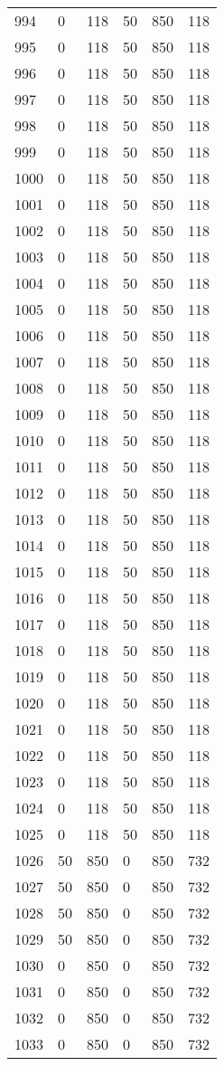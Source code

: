 \documentclass[a4paper]{ctexart}
\begin{document}
\begin{longtable}{p{1cm}|p{2cm}|p{2cm}|p{2cm}|P{2cm}|p{2cm}}
		994&0&118&50&850&118\\
		995&0&118&50&850&118\\
		996&0&118&50&850&118\\
		997&0&118&50&850&118\\
		998&0&118&50&850&118\\
		999&0&118&50&850&118\\
		1000&0&118&50&850&118\\
		1001&0&118&50&850&118\\
		1002&0&118&50&850&118\\
		1003&0&118&50&850&118\\
		1004&0&118&50&850&118\\
		1005&0&118&50&850&118\\
		1006&0&118&50&850&118\\
		1007&0&118&50&850&118\\
		1008&0&118&50&850&118\\
		1009&0&118&50&850&118\\
		1010&0&118&50&850&118\\
		1011&0&118&50&850&118\\
		1012&0&118&50&850&118\\
		1013&0&118&50&850&118\\
		1014&0&118&50&850&118\\
		1015&0&118&50&850&118\\
		1016&0&118&50&850&118\\
		1017&0&118&50&850&118\\
		1018&0&118&50&850&118\\
		1019&0&118&50&850&118\\
		1020&0&118&50&850&118\\
		1021&0&118&50&850&118\\
		1022&0&118&50&850&118\\
		1023&0&118&50&850&118\\
		1024&0&118&50&850&118\\
		1025&0&118&50&850&118\\
		1026&50&850&0&850&732\\
		1027&50&850&0&850&732\\
		1028&50&850&0&850&732\\
		1029&50&850&0&850&732\\
		1030&0&850&0&850&732\\
		1031&0&850&0&850&732\\
		1032&0&850&0&850&732\\
		1033&0&850&0&850&732\\

\end{longtable}
\end{document}
